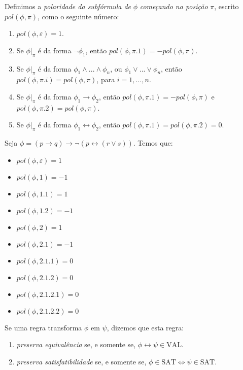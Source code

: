 \begin{definition}
    Definimos a \emph{polaridade da subfórmula de} $\phi$ \emph{começando na posição} $\pi$, escrito $pol(\phi,\pi)$, como o seguinte número:
    \begin{enumerate}
        \item $pol(\phi,\varepsilon) = 1$.
        \item Se $\phi|_\pi$ é da forma $\neg \phi_1$, então $pol(\phi,\pi.1) = -pol(\phi,\pi)$.
        \item Se $\phi|_\pi$ é da forma $\phi_1 \wedge ... \wedge \phi_n$, ou $\phi_1 \vee ... \vee \phi_n$, então $pol(\phi,\pi.i) = pol(\phi,\pi)$, para $i=1,...,n$.
        \item Se $\phi|_\pi$ é da forma $\phi_1 \rightarrow \phi_2$, então $pol(\phi,\pi.1) = -pol(\phi,\pi)$ e $pol(\phi,\pi.2) = pol(\phi,\pi)$.
        \item Se $\phi|_\pi$ é da forma $\phi_1 \leftrightarrow \phi_2$, então $pol(\phi,\pi.1) = pol(\phi,\pi.2) = 0$.
    \end{enumerate}
\end{definition}

\begin{example}
    Seja $\phi = (p \rightarrow q) \rightarrow \neg(p \leftrightarrow (r \vee s))$. Temos que:
    \begin{itemize}
        \item $pol(\phi,\varepsilon) = 1$
        \item $pol(\phi,1) = -1$
        \item $pol(\phi,1.1) = 1$
        \item $pol(\phi,1.2) = -1$
        \item $pol(\phi,2) = 1$
        \item $pol(\phi,2.1) = -1$
        \item $pol(\phi,2.1.1) = 0$
        \item $pol(\phi,2.1.2) = 0$
        \item $pol(\phi,2.1.2.1) = 0$
        \item $pol(\phi,2.1.2.2) = 0$
    \end{itemize}
\end{example}

\begin{definition}
	Se uma regra transforma $\phi$ em $\psi$, dizemos que esta regra:
	\begin{enumerate}
		\item \emph{preserva equivalência} se, e somente se, $\phi \leftrightarrow \psi \in \text{VAL}$.
		\item \emph{preserva satisfatibilidade} se, e somente se, $\phi \in \text{SAT} \iff \psi \in \text{SAT}$.
	\end{enumerate}
\end{definition}

